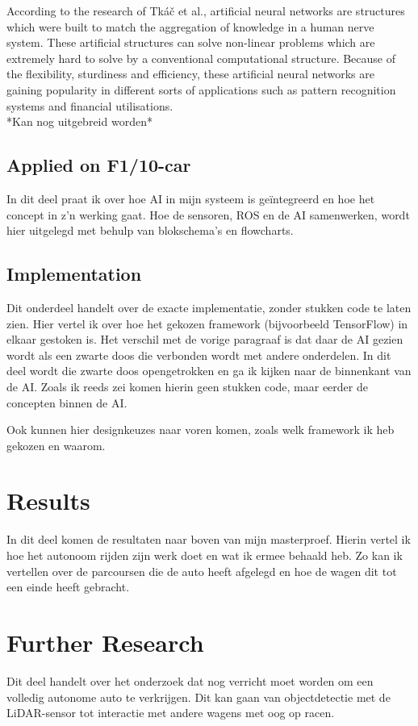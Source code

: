 \documentclass[conference,a4paper]{IEEEtran}
\begin{document}
According to the research of Tk{\'{a}}{\v{c}} et al.\cite{Tkac2015}, artificial neural networks are structures which were built to match the aggregation of knowledge in a human nerve system. These artificial structures can solve non-linear problems which are extremely hard to solve by a conventional computational structure. Because of the flexibility, sturdiness and efficiency, these artificial neural networks are gaining popularity in different sorts of applications such as pattern recognition systems and financial utilisations.\cite{yegnanarayana2009artificial,Tkac2015}\\

*Kan nog uitgebreid worden*

\subsection{Applied on F1/10-car}
In dit deel praat ik over hoe AI in mijn systeem is ge\"{i}ntegreerd en hoe het concept in z'n werking gaat. Hoe de sensoren, ROS en de AI samenwerken, wordt hier uitgelegd met behulp van blokschema's en flowcharts. 

\subsection{Implementation}
Dit onderdeel handelt over de exacte implementatie, zonder stukken code te laten zien. Hier vertel ik over hoe het gekozen framework (bijvoorbeeld TensorFlow) in elkaar gestoken is. Het verschil met de vorige paragraaf is dat daar de AI gezien wordt als een zwarte doos die verbonden wordt met andere onderdelen. In dit deel wordt die zwarte doos opengetrokken en ga ik kijken naar de binnenkant van de AI. Zoals ik reeds zei komen hierin geen stukken code, maar eerder de concepten binnen de AI.

Ook kunnen hier designkeuzes naar voren komen, zoals welk framework ik heb gekozen en waarom. 

\section{Results}
In dit deel komen de resultaten naar boven van mijn masterproef. Hierin vertel ik hoe het autonoom rijden zijn werk doet en wat ik ermee behaald heb. Zo kan ik vertellen over de parcoursen die de auto heeft afgelegd en hoe de wagen dit tot een einde heeft gebracht. 

\section{Further Research}
Dit deel handelt over het onderzoek dat nog verricht moet worden om een volledig autonome auto te verkrijgen. Dit kan gaan van objectdetectie met de LiDAR-sensor tot interactie met andere wagens met oog op racen.
\end{document}
